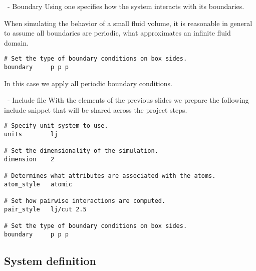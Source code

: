 \begin{frame}[fragile]{\secname}{\subsecname\ - Boundary}
Using  one specifies how the system interacts with its boundaries.

\vspace{0.5cm}

When simulating the behavior of a small fluid volume, it is reasonable in general to assume all boundaries are periodic, what approximates an infinite fluid domain.

\vspace{0.5cm}

\begin{lstlisting}[language=LAMMPS]
# Set the type of boundary conditions on box sides.
boundary     p p p
\end{lstlisting}

\vspace{0.5cm}
In this case we apply all periodic boundary conditions.
\end{frame}

\begin{frame}[fragile]{\secname}{\subsecname\ - Include file}
With the elements of the previous slides we prepare the following include snippet that will be shared across the project steps.

\vspace{0.5cm}

\begin{lstlisting}[language=LAMMPS,basicstyle=\tiny]
# Specify unit system to use.
units        lj

# Set the dimensionality of the simulation.
dimension    2

# Determines what attributes are associated with the atoms.
atom_style   atomic

# Set how pairwise interactions are computed.
pair_style   lj/cut 2.5

# Set the type of boundary conditions on box sides.
boundary     p p p
\end{lstlisting}
\end{frame}

\subsection{System definition}

